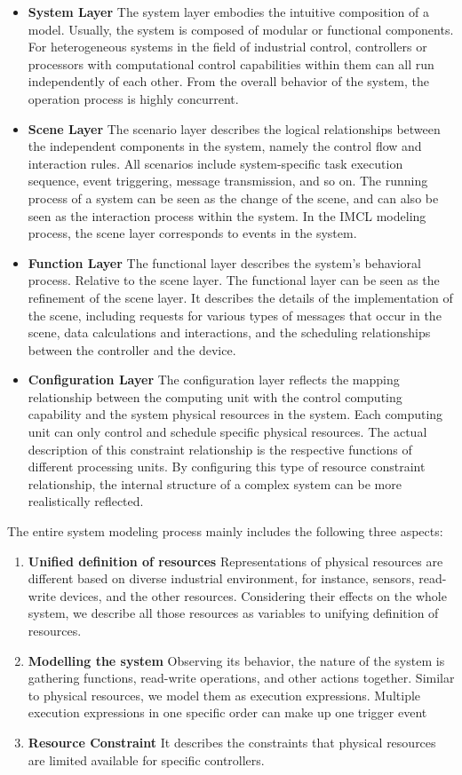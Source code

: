\begin{itemize}
  \item \textbf{System Layer} The system layer embodies the intuitive composition of a model. Usually, the system is composed of modular or functional components. For heterogeneous systems in the field of industrial control, controllers or processors with computational control capabilities within them can all run independently of each other. From the overall behavior of the system, the operation process is highly concurrent.
  \item \textbf{Scene Layer} The scenario layer describes the logical relationships between the independent components in the system, namely the control flow and interaction rules. All scenarios include system-specific task execution sequence, event triggering, message transmission, and so on. The running process of a system can be seen as the change of the scene, and can also be seen as the interaction process within the system. In the IMCL modeling process, the scene layer corresponds to events in the system.
  \item \textbf{Function Layer} The functional layer describes the system's behavioral process. Relative to the scene layer. The functional layer can be seen as the refinement of the scene layer. It describes the details of the implementation of the scene, including requests for various types of messages that occur in the scene, data calculations and interactions, and the scheduling relationships between the controller and the device.
  \item \textbf{Configuration Layer} The configuration layer reflects the mapping relationship between the computing unit with the control computing capability and the system physical resources in the system. Each computing unit can only control and schedule specific physical resources. The actual description of this constraint relationship is the respective functions of different processing units. By configuring this type of resource constraint relationship, the internal structure of a complex system can be more realistically reflected.
\end{itemize}

The entire system modeling process mainly includes the following three aspects:
\begin{enumerate}
  \item \textbf{Unified definition of resources} Representations of physical resources are different based on diverse industrial environment, for instance, sensors, read-write devices, and the other resources. Considering their effects on the whole system, we describe all those resources as variables to unifying definition of resources.
  \item \textbf{Modelling the system} Observing its behavior, the nature of the system is gathering functions, read-write operations, and other actions together. Similar to physical resources, we model them as execution expressions. Multiple execution expressions in one specific order can make up one trigger event
  \item \textbf{Resource Constraint}  It describes the constraints that physical resources are limited available for specific controllers.
\end{enumerate}

